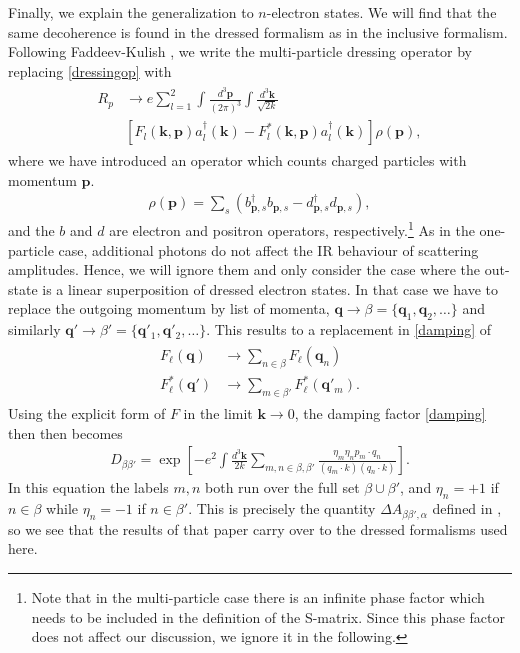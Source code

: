\documentclass[twocolumn,prd]{revtex4}
\newcommand{\mb}{\mathbf}
\begin{document}
Finally, we explain the generalization to $n$-electron states. We will find that the same decoherence is found in the dressed formalism as in the inclusive formalism.\cite{Carney:2017jut} Following Faddeev-Kulish \cite{Kulish:1970ut}, we write the multi-particle dressing operator by replacing \eqref{dressingop} with
\begin{align}
\begin{split}
R_p & \to e \sum_{l=1}^2 \int \frac{d^3 \mathbf p}{(2\pi)^3} \int \frac{d^3 \mathbf k}{\sqrt{2k}} \\
& \left[ F_l(\mathbf{k},\mathbf{p}) a_l^\dagger(\mathbf k) - F^*_l(\mathbf{k},\mathbf{p}) a_l^\dagger(\mathbf k) \right] \rho(\mathbf p),
\end{split}
\end{align} 
where we have introduced an operator which counts charged particles with momentum $\mathbf p$.
\begin{align}
\rho(\mathbf p) = \sum_s \left( b_{\mathbf p,s}^\dagger b_{\mathbf p,s} - d_{\mathbf p,s}^\dagger d_{\mathbf p,s}\right),
\end{align}
and the $b$ and $d$ are electron and positron operators, respectively.\footnote{Note that in the multi-particle case there is an infinite phase factor which needs to be included in the definition of the S-matrix. Since this phase factor does not affect our discussion, we ignore it in the following.} As in the one-particle case, additional photons do not affect the IR behaviour of scattering amplitudes. Hence, we will ignore them and only consider the case where the out-state is a linear superposition of dressed electron states. In that case we have to replace the outgoing momentum by list of momenta, $\mb{q} \to \beta = \{ \mb{q}_1, \mb{q}_2, \ldots \}$ and similarly $\mb{q}' \to \beta' = \{ \mb{q}'_1, \mb{q}'_2, \ldots \}$. This results to a replacement in \eqref{damping} of 
\begin{align}
\begin{split}
F_{\ell}(\mb{q}) & \to \sum_{n \in \beta} F_{\ell}(\mb{q}_n) \\
F^*_{\ell}(\mb{q}') & \to \sum_{m \in \beta'} F^*_{\ell}(\mb{q}'_m).
\end{split}
\end{align}
Using the explicit form of $F$ in the limit $\mb{k} \to 0$, the damping factor \eqref{damping} then then becomes
\begin{align}
\label{fulldamping}
D_{\beta\beta'} = \exp \left[ -e^2 \int \frac{d^3 \mathbf k}{2k} \sum_{m,n \in \beta,\beta'} \frac{\eta_m \eta_n p_m \cdot q_n}{(q_m \cdot k)(q_n \cdot k)} \right].
\end{align}
In this equation the labels $m,n$ both run over the full set $\beta \cup \beta'$, and  $\eta_n = +1$ if $n \in \beta$ while $\eta_n = -1$ if $n \in \beta'$. This is precisely the quantity $\Delta A_{\beta\beta', \alpha}$ defined in \cite{Carney:2017jut}, so we see that the results of that paper carry over to the dressed formalisms used here.
\end{document}
